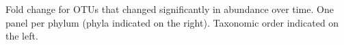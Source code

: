 Fold change for OTUs that changed significantly in abundance over time. One panel per phylum (phyla indicated on the right). Taxonomic order indicated on the left.
